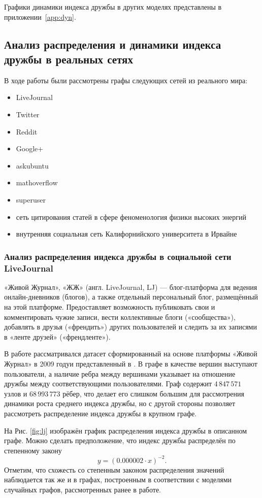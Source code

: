 \documentclass[bachelor, och, diploma]{SCWorks}
\begin{document}
Графики динамики индекса дружбы в других моделях представлены в приложении~\ref{app:dyn}.
\subsection{Анализ распределения и динамики индекса дружбы в реальных сетях}	
В ходе работы были рассмотрены графы следующих сетей из реального мира:
\begin{itemize}
\item LiveJournal
\item Twitter
\item Reddit
\item Google+
\item askubuntu
\item mathoverflow
\item superuser
\item сеть цитирования статей в сфере феноменология физики высоких энергий
\item внутренняя социальная сеть Калифорнийского университета в Ирвайне
\end{itemize}
\subsubsection{Анализ распределения индекса дружбы в социальной сети LiveJournal}
«Живой Журнал», «ЖЖ» (англ. LiveJournal, LJ) — блог-платформа для ведения онлайн-дневников (блогов), а также отдельный персональный блог, размещённый на этой платформе. Предоставляет возможность публиковать свои и комментировать чужие записи, вести коллективные блоги («сообщества»), добавлять в друзья («френдить») других пользователей и следить за их записями в «ленте друзей» («френдленте»). 

В работе рассматривался датасет сформированный на основе платформы «Живой Журнал» в 2009 годуи представленный в \cite{lj}. В графе в качестве вершин выступают пользователи, а наличие ребра между вершинами указывает на отношение дружбы между соответствующими пользователями. Граф содержит $4\,847\,571$ узлов и $68\,993\,773$ рёбер, что делает его слишком большим для рассмотрения динамики роста среднего индекса дружбы, но с другой стороны позволяет рассмотреть распределение индекса дружбы в крупном графе. 

На Рис. \ref{fig:lj} изображён график распределения индекса дружбы в описанном графе. Можно сделать предположение, что индекс дружбы распределён по степенному закону 
\[
y = (0.000002 \cdot x)^{-2}.
\]
Отметим, что схожесть со степенным законом распределения значений наблюдается так же и в графах, построенным в соответствии с моделями случайных графов, рассмотренных ранее в работе.
\end{document}
